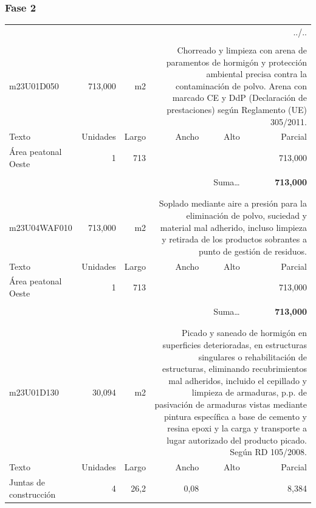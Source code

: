 \documentclass{book}%
\begin{document}
\subsubsection{Fase 2}%
\begin{longtable}{lrrrrr}%
\multicolumn{6}{r}{../..}\\%
\endfoot%
\endlastfoot%
&&&&&\\%
m23U01D050&   713,000& m2&\multicolumn{3}{p{6cm}}{\scriptsize Chorreado y limpieza con arena de paramentos de hormigón y protección ambiental precisa contra la contaminación de polvo. Arena con marcado CE y DdP (Declaración de prestaciones) según Reglamento (UE) 305/2011.\normalsize}\\%
Texto&Unidades&Largo&Ancho&Alto&Parcial\\%
\hline%
\multicolumn{1}{p{3.5cm}}{Área peatonal Oeste}&1&713&&&   713,000\\%
&&&&&\\%
\multicolumn{5}{r}{Suma\ldots}&\textbf{   713,000}\\%
\hline%
&&&&&\\%
&&&&&\\%
m23U04WAF010&   713,000& m2&\multicolumn{3}{p{6cm}}{\scriptsize Soplado mediante aire a presión para la eliminación de polvo, suciedad y material mal adherido, incluso limpieza y retirada de los productos sobrantes a punto de gestión de residuos.\normalsize}\\%
Texto&Unidades&Largo&Ancho&Alto&Parcial\\%
\hline%
\multicolumn{1}{p{3.5cm}}{Área peatonal Oeste}&1&713&&&   713,000\\%
&&&&&\\%
\multicolumn{5}{r}{Suma\ldots}&\textbf{   713,000}\\%
\hline%
&&&&&\\%
&&&&&\\%
m23U01D130&    30,094& m2&\multicolumn{3}{p{6cm}}{\scriptsize Picado y saneado de hormigón en superficies deterioradas, en estructuras singulares o rehabilitación de estructuras, eliminando recubrimientos mal adheridos, incluido el cepillado y limpieza de armaduras, p.p. de pasivación de armaduras vistas mediante pintura específica a base de cemento y resina epoxi y la carga y transporte a lugar autorizado del producto picado. Según RD 105/2008.\normalsize}\\%
Texto&Unidades&Largo&Ancho&Alto&Parcial\\%
\hline%
\multicolumn{1}{p{3.5cm}}{Juntas de construcción}&4&26,2&0,08&&     8,384\\%

\end{longtable}
\end{document}
